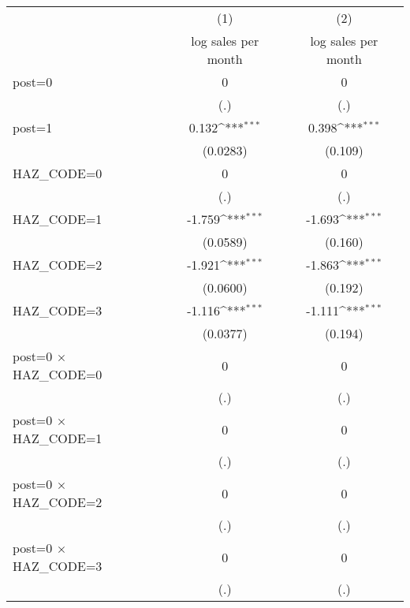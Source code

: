 {
\def\sym#1{\ifmmode^{#1}\else\(^{#1}\)\fi}
\begin{tabular}{l*{2}{c}}
\hline\hline
                    &\multicolumn{1}{c}{(1)}&\multicolumn{1}{c}{(2)}\\
                    &\multicolumn{1}{c}{log sales per month}&\multicolumn{1}{c}{log sales per month}\\
\hline
post=0              &           0         &           0         \\
                    &         (.)         &         (.)         \\
[1em]
post=1              &       0.132\sym{***}&       0.398\sym{***}\\
                    &    (0.0283)         &     (0.109)         \\
[1em]
HAZ\_CODE=0          &           0         &           0         \\
                    &         (.)         &         (.)         \\
[1em]
HAZ\_CODE=1          &      -1.759\sym{***}&      -1.693\sym{***}\\
                    &    (0.0589)         &     (0.160)         \\
[1em]
HAZ\_CODE=2          &      -1.921\sym{***}&      -1.863\sym{***}\\
                    &    (0.0600)         &     (0.192)         \\
[1em]
HAZ\_CODE=3          &      -1.116\sym{***}&      -1.111\sym{***}\\
                    &    (0.0377)         &     (0.194)         \\
[1em]
post=0 $\times$ HAZ\_CODE=0&           0         &           0         \\
                    &         (.)         &         (.)         \\
[1em]
post=0 $\times$ HAZ\_CODE=1&           0         &           0         \\
                    &         (.)         &         (.)         \\
[1em]
post=0 $\times$ HAZ\_CODE=2&           0         &           0         \\
                    &         (.)         &         (.)         \\
[1em]
post=0 $\times$ HAZ\_CODE=3&           0         &           0         \\
                    &         (.)         &         (.)         \\

\end{tabular}}
